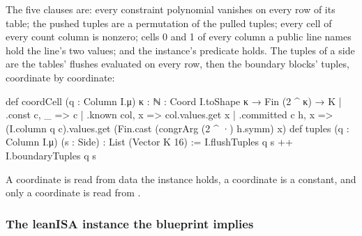 The five clauses are: every constraint polynomial vanishes on every row of its table; the pushed
tuples are a permutation of the pulled tuples; every cell of every count column is nonzero; cells
0 and 1 of every column a public line names hold the line's two values; and the instance's
predicate  holds. The tuples of a side are the tables' flushes evaluated on every row,
then the boundary blocks' tuples, coordinate by coordinate:
\begin{leancode}
def coordCell (q : Column I.μ) {κ : ℕ} : Coord I.toShape κ → Fin (2 ^ κ) → K
  | .const c, _ => c
  | .known col, x => col.values.get x
  | .committed c h, x => (I.column q c).values.get (Fin.cast (congrArg (2 ^ ·) h.symm) x)
def tuples (q : Column I.μ) (s : Side) : List (Vector K 16) :=
  I.flushTuples q s ++ I.boundaryTuples q s
\end{leancode}

A  coordinate is read from data the instance holds, a  coordinate is a
constant, and only a  coordinate is read from .

\subsubsection{The leanISA instance the blueprint implies}\label{sec:gen-boundary-instance}

